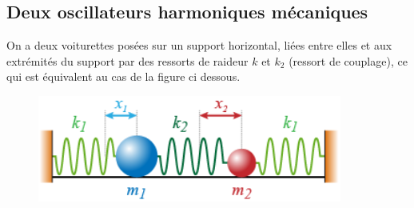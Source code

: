 \documentclass[12pt,prb,aps,epsf]{article}
\begin{document}
\subsection{Deux oscillateurs harmoniques mécaniques}
On a deux voiturettes posées sur un support horizontal, liées entre elles et aux extrémités du support par des ressorts de raideur $k$  et $k_2$ (ressort de couplage), ce qui est équivalent au cas de la figure ci dessous.\\
\begin{figure}[h]
	\centering \includegraphics[width=10cm]{oh_couples}
\end{figure}
\end{document}
